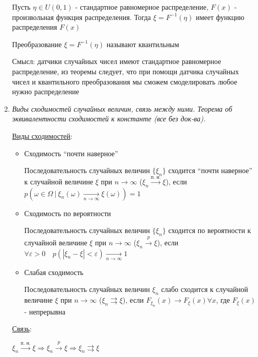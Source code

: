 \documentclass[12pt]{article}
\begin{document}
\begin{enumerate}
    Пусть $\eta \in U(0, 1)$ - стандартное равномерное распределение, $F(x)$ - произвольная функция распределения. 
    Тогда $\xi = F^{-1}(\eta)$ имеет функцию распределения $F(x)$

    Преобразование $\xi = F^{-1}(\eta)$ называют квантильным

    Смысл: датчики случайных чисел имеют стандартное равномерное распределение, из теоремы следует, что при помощи
    датчика случайных чисел и квантильного преобразования мы сможем смоделировать любое нужно распределение


    \item \textit{Виды сходимостей случайных величин, связь между ними. Теорема об эквивалентности сходимостей к константе (все без док-ва).}

    \hyperlink{convergencetypes}{Виды сходимостей}:

    \begin{itemize}
        \item Сходимость \enquote{почти наверное}

        \Defs Последовательность случайных величин $\{\xi_n\}$ сходится \enquote{почти наверное} к случайной величине $\xi$ при $n \to \infty$ ($\xi_n \overset{\text{п. н.}}{\longrightarrow} \xi$), 
        если $p(\omega \in \Omega \ | \ \xi_n(\omega) \underset{n \to \infty}{\longrightarrow} \xi(\omega)) = 1$

        \item Сходимость по вероятности

        \Defs Последовательность случайных величин $\{\xi_n\}$ сходится по вероятности к случайной величине $\xi$ при $n \to \infty$
        ($\xi_n \overset{p}{\longrightarrow} \xi$), если $\forall \varepsilon > 0 \quad p(|\xi_n - \xi| < \varepsilon) \underset{n \to \infty}{\longrightarrow} 1$
        
        \item Слабая сходимость

        \Defs Последовательность случайных величин $\xi_n$ слабо сходится к случайной величине $\xi$ при $n \to \infty$
        ($\xi_n \rightrightarrows \xi$), если $F_{\xi_n}(x) \longrightarrow F_\xi(x) \forall x$, где $F_\xi(x)$ - непрерывна
    \end{itemize}

    \hyperlink{connectionbetweenconvergencetypes}{Связь}: 

    \Ths $\xi_n \overset{\text{п. н.}}{\longrightarrow} \xi \Longrightarrow \xi_n \overset{p}{\longrightarrow} \xi \Longrightarrow \xi_n \rightrightarrows \xi$


\end{enumerate}
\end{document}
